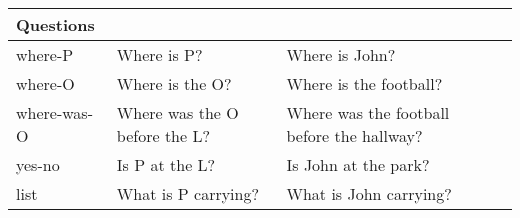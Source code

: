\begin{table*}[]
\begin{tabular}{@{}llll@{}}
Questions                                                        &                                                                                                                                                              &                                                                                                               &                                                                                                   \\ \midrule
where-P                                                          & Where is P?                                                                                                                                                  & Where is John?                                                                                                &                                                                                                   \\
where-O                                                          & Where is the O?                                                                                                                                              & Where is the football?                                                                                        &                                                                                                   \\
where-was-O                                                      & Where was the O before the L?                                                                                                                                & Where was the football before the hallway?                                                                    &                                                                                                   \\
yes-no                                                           & Is P at the L?                                                                                                                                               & Is John at the park?                                                                                          &                                                                                                   \\
list                                                             & What is P carrying?                                                                                                                                          & What is John carrying?                                                                                        &                                                                                                   \\

\end{tabular}
\end{table*}
